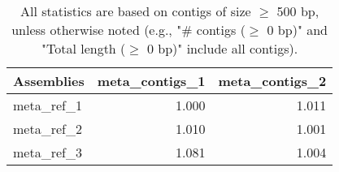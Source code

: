 \documentclass[12pt,a4paper]{article}
\begin{document}
\begin{table}[ht]
\begin{center}
\caption{All statistics are based on contigs of size $\geq$ 500 bp, unless otherwise noted (e.g., "\# contigs ($\geq$ 0 bp)" and "Total length ($\geq$ 0 bp)" include all contigs).}
\begin{tabular}{|l*{2}{|r}|}
\hline
Assemblies & meta\_contigs\_1 & meta\_contigs\_2 \\ \hline
meta\_ref\_1 & 1.000 & 1.011 \\ \hline
meta\_ref\_2 & 1.010 & 1.001 \\ \hline
meta\_ref\_3 & 1.081 & 1.004 \\ \hline
\end{tabular}
\end{center}
\end{table}
\end{document}

